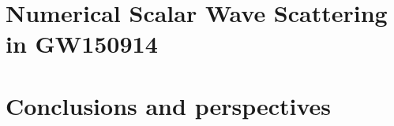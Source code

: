 \documentclass[12pt, twoside]{report}
\newcommand\myclearpage{\cleartooddpage[\thispagestyle{empty}]}
\begin{document}
\myclearpage
\par

\chapter{Numerical Scalar Wave Scattering in GW150914}
\label{ch:wave_scattering}


\myclearpage
\par

\chapter{Conclusions and perspectives}
\label{ch:conclusion}


\myclearpage
\par




\end{document}
